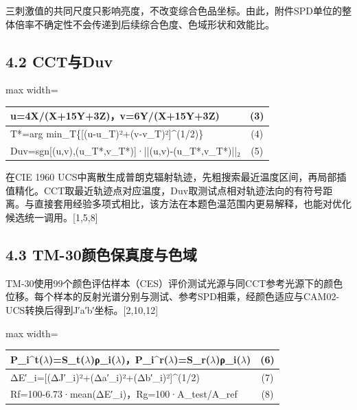 \documentclass[UTF8,a4paper,12pt]{ctexart}
\begin{document}
三刺激值的共同尺度只影响亮度，不改变综合色品坐标。由此，附件SPD单位的整体倍率不确定性不会传递到后续综合色度、色域形状和效能比。

\subsection{4.2 CCT与Duv}

\begin{table}[H]
\centering
\small
\begin{adjustbox}{max width=\textwidth}
\begin{tabular}{lc}
\toprule
u=4X/(X+15Y+3Z)，v=6Y/(X+15Y+3Z) & (3) \\
\midrule
T*=arg min\_T\{[(u-u\_T)²+(v-v\_T)²]\textasciicircum{}(1/2)\} & (4) \\
Duv=sgn[(u,v),(u\_T*,v\_T*)]·||(u,v)-(u\_T*,v\_T*)||₂ & (5) \\
\bottomrule
\end{tabular}
\end{adjustbox}
\end{table}

在CIE 1960 UCS中离散生成普朗克辐射轨迹，先粗搜索最近温度区间，再局部插值精化。CCT取最近轨迹点对应温度，Duv取测试点相对轨迹法向的有符号距离。与直接套用经验多项式相比，该方法在本题色温范围内更易解释，也能对优化候选统一调用。[1,5,8]

\subsection{4.3 TM-30颜色保真度与色域}

TM-30使用99个颜色评估样本（CES）评价测试光源与同CCT参考光源下的颜色位移。每个样本的反射光谱分别与测试、参考SPD相乘，经颜色适应与CAM02-UCS转换后得到J′a′b′坐标。[2,10,12]

\begin{table}[H]
\centering
\small
\begin{adjustbox}{max width=\textwidth}
\begin{tabular}{lc}
\toprule
P\_i\textasciicircum{}t($\lambda$)=S\_t($\lambda$)ρ\_i($\lambda$)，P\_i\textasciicircum{}r($\lambda$)=S\_r($\lambda$)ρ\_i($\lambda$) & (6) \\
\midrule
ΔE′\_i=[(ΔJ′\_i)²+(Δa′\_i)²+(Δb′\_i)²]\textasciicircum{}(1/2) & (7) \\
Rf=100-6.73·mean(ΔE′\_i)，Rg=100·A\_test/A\_ref & (8) \\
\bottomrule
\end{tabular}
\end{adjustbox}
\end{table}
\end{document}
